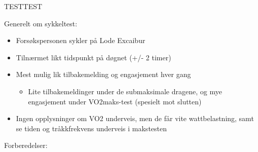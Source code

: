\documentclass[
  letterpaper,
  DIV=11,
  numbers=noendperiod]{scrartcl}
\providecommand{\tightlist}{%
  \setlength{\itemsep}{0pt}\setlength{\parskip}{0pt}}\usepackage{longtable,booktabs,array}
\begin{document}
TESTTEST

Generelt om sykkeltest:

\begin{itemize}
\tightlist
\item
  Forsøkspersonen sykler på Lode Excaibur
\item
  Tilnærmet likt tidspunkt på døgnet (+/- 2 timer)
\item
  Mest mulig lik tilbakemelding og engasjement hver gang

  \begin{itemize}
  \tightlist
  \item
    Lite tilbakemeldinger under de submaksimale dragene, og mye
    engasjement under VO2maks-test (spesielt mot slutten)
  \end{itemize}
\item
  Ingen opplysninger om VO2 underveis, men de får vite wattbelastning,
  samt se tiden og tråkkfrekvens underveis i makstesten
\end{itemize}

Forberedelser:
\end{document}
